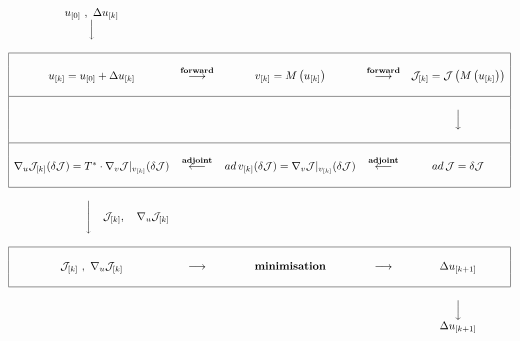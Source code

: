 {\scriptsize
\begin{eqnarray*}
\begin{array}{ccccc}
u_{[0]} \,\, ,  \,\, \Delta u_{[k]}    & ~ & ~ & ~ & ~ \\
{\Big\downarrow} 
   & ~ & ~ & ~ & ~ \\
 ~ & ~ & ~ & ~ & ~ \\
\hline
\multicolumn{1}{|c}{~} & ~ & ~ & ~ & \multicolumn{1}{c|}{~} \\
\multicolumn{1}{|c}{
u_{[k]} = u_{[0]} + \Delta u_{[k]}} &
\stackrel{\bf forward}{\bf \longrightarrow} &
v_{[k]} = M \left( u_{[k]} \right) &
\stackrel{\bf forward}{\bf \longrightarrow} &
\multicolumn{1}{c|}{
{\cal J}_{[k]} = {\cal J} \left( M \left( u_{[k]} \right) \right)} \\
\multicolumn{1}{|c}{~} & ~ & ~ & ~ & \multicolumn{1}{c|}{~} \\
\hline
\multicolumn{1}{|c}{~} & ~ & ~ & ~ & \multicolumn{1}{c|}{~}  \\
\multicolumn{1}{|c}{~} & ~ & ~ & ~ & \multicolumn{1}{c|}{{\Big\downarrow}} \\
\multicolumn{1}{|c}{~} & ~ & ~ & ~ & \multicolumn{1}{c|}{~}  \\
\hline
\multicolumn{1}{|c}{~} & ~ & ~ & ~ & \multicolumn{1}{c|}{~} \\
\multicolumn{1}{|c}{
\nabla_u {\cal J}_{[k]} (\delta {\cal J}) = 
T^{\ast} \cdot \nabla_v {\cal J} |_{v_{[k]}} (\delta {\cal J})} &
\stackrel{\bf adjoint}{\mathbf \longleftarrow} &
ad \, v_{[k]} (\delta {\cal J}) = 
\nabla_v {\cal J} |_{v_{[k]}} (\delta {\cal J}) &
\stackrel{\bf adjoint}{\mathbf \longleftarrow} &
\multicolumn{1}{c|}{ ad \, {\cal J} = \delta {\cal J}} \\
\multicolumn{1}{|c}{~} & ~ & ~ & ~ & \multicolumn{1}{c|}{~} \\
\hline
 ~ & ~ & ~ & ~ & ~ \\
\hspace*{15ex}{\Bigg\downarrow}  
\quad {\cal J}_{[k]}, \quad \nabla_u {\cal J}_{[k]}
 & ~ & ~ & ~ & ~ \\
 ~ & ~ & ~ & ~ & ~ \\
\hline
\multicolumn{1}{|c}{~} & ~ & ~ & ~ & \multicolumn{1}{c|}{~} \\
\multicolumn{1}{|c}{
{\cal J}_{[k]} \,\, ,  \,\, \nabla_u {\cal J}_{[k]}} &
{\mathbf \longrightarrow} & \text{\bf minimisation} &
{\mathbf \longrightarrow} & 
\multicolumn{1}{c|}{ \Delta u_{[k+1]}} \\
\multicolumn{1}{|c}{~} & ~ & ~ & ~ & \multicolumn{1}{c|}{~} \\
\hline
 ~ & ~ & ~ & ~ & ~ \\
 ~ & ~ & ~ & ~ & \Big\downarrow \\
 ~ & ~ & ~ & ~ & \Delta u_{[k+1]} \\
\end{array}
\end{eqnarray*}
}

